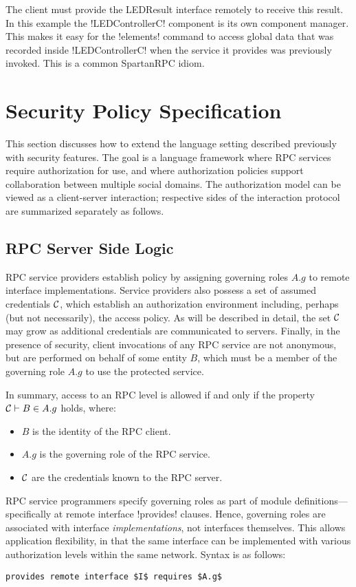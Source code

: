 The client must provide the LEDResult interface remotely to receive this result. In this example
the !LEDControllerC! component is its own component manager. This makes it easy for the
!elements! command to access global data that was recorded inside !LEDControllerC! when the
service it provides was previously invoked. This is a common SpartanRPC idiom.

\section{Security Policy Specification}
\label{section-security-extensions}

This section discusses how to extend the language setting described previously with security
features. The goal is a language framework where RPC services require authorization for use, and
where authorization policies support collaboration between multiple social domains. The
authorization model can be viewed as a client-server interaction; respective sides of the
interaction protocol are summarized separately as follows.

\subsection{RPC Server Side Logic}
\label{section-rpc-server-side}

RPC service providers establish policy by assigning governing roles $A.g$ to remote interface
implementations. Service providers also possess a set of assumed credentials $\mathcal{C}$, which
establish an authorization environment including, perhaps (but not necessarily), the access
policy. As will be described in detail, the set $\mathcal{C}$ may grow as additional credentials are
communicated to servers. Finally, in the presence of security, client invocations of any RPC
service are not anonymous, but are performed on behalf of some entity $B$, which must be a
member of the governing role $A.g$ to use the protected service.

In summary, access to an RPC level is allowed if and only if the property $\mathcal{C} \vdash B \in
A.g$ holds, where:
\begin{itemize}
  \item $B$ is the identity of the RPC client.
  \item $A.g$ is the governing role of the RPC service.
  \item $\mathcal{C}$ are the credentials known to the RPC server.
\end{itemize}
RPC service programmers specify governing roles as part of module definitions---specifically at
remote interface !provides! clauses. Hence, governing roles are associated with interface
\emph{implementations}, not interfaces themselves. This allows application flexibility, in that
the same interface can be implemented with various authorization levels within the same network.
Syntax is as follows:
\begin{lstlisting}[mathescape=true]
provides remote interface $I$ requires $A.g$
\end{lstlisting}

